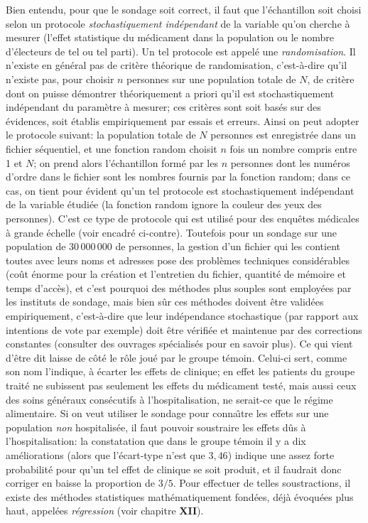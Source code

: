 Bien entendu, pour que le sondage soit correct, il faut que
l'\'echantillon soit choisi selon un protocole {\it stochastiquement 
ind\'ependant} de la variable qu'on cherche \`a mesurer (l'effet 
statistique du m\'edicament dans la population ou le nombre
d'\'electeurs de tel ou tel parti). Un tel protocole est appel\'e une {\it 
randomisation}. 
\medskip 
Il n'existe en g\'en\'eral pas de crit\`ere th\'eorique de randomisation, 
c'est-\`a-dire qu'il n'existe pas, pour choisir $n$ personnes sur une 
population totale de $N$, de crit\`ere dont on puisse d\'emontrer 
th\'eoriquement a priori qu'il est stochastiquement ind\'ependant du 
param\`etre \`a mesurer; ces crit\`eres sont soit bas\'es sur des 
{\og \'evidences\fg}, soit \'etablis empiriquement par essais et erreurs. 
Ainsi on peut adopter le protocole suivant: la population totale de $N$ 
personnes est enregistr\'ee dans un fichier s\'equentiel, et une fonction 
random choisit $n$ fois un nombre compris entre 1 et $N$; on prend alors 
l'\'echantillon form\'e par les $n$ personnes dont les num\'eros d'ordre 
dans le fichier sont les nombres fournis par la fonction random; dans ce 
cas, on tient pour {\og \'evident\fg} qu'un tel protocole est stochastiquement 
ind\'ependant de la variable \'etudi\'ee (la fonction random {\og ignore\fg}
la couleur des yeux des personnes). C'est ce type de protocole qui est 
utilis\'e pour des enqu\^etes m\'edicales \`a grande \'echelle (voir 
encadr\'e ci-contre). 
\medskip 
Toutefois pour un sondage sur une population de 
$30\, 000\, 000$ de personnes, la gestion d'un fichier qui les contient 
toutes avec leurs noms et adresses pose des probl\`emes techniques 
consid\'erables (co\^ut \'enorme pour la cr\'eation et l'entretien du 
fichier, quantit\'e de m\'emoire et temps d'acc\`es), et c'est pourquoi
des m\'ethodes plus souples sont employ\'ees par les instituts de 
sondage, mais bien s\^ur ces m\'ethodes doivent \^etre valid\'ees 
empiriquement, c'est-\`a-dire que leur ind\'ependance stochastique
(par rapport aux intentions de vote par exemple) doit \^etre v\'erifi\'ee 
et maintenue par des corrections constantes (consulter des ouvrages 
sp\'ecialis\'es pour en savoir plus). 
\medskip
Ce qui vient d'\^etre dit laisse de c\^ot\'e le r\^ole jou\'e par le groupe 
t\'emoin. Celui-ci sert, comme son nom l'indique, \`a \'ecarter les
effets de clinique; en effet les patients du groupe trait\'e ne subissent
pas seulement les effets du m\'edicament test\'e, mais aussi ceux des 
soins g\'en\'eraux cons\'ecutifs \`a l'hospitalisation, ne serait-ce que
le r\'egime alimentaire. Si on veut utiliser le sondage pour conna{\^\i}tre 
les effets sur une population {\it non} hospitalis\'ee, il faut pouvoir 
soustraire les effets d\^us \`a l'hospitalisation: la constatation que
dans le groupe t\'emoin il y a dix am\'eliorations (alors que 
l'\'ecart-type n'est que $3,46$) indique une assez forte probabilit\'e 
pour qu'un tel effet de clinique se soit produit, et il faudrait donc 
corriger en baisse la proportion de $3/5$. Pour effectuer de telles 
soustractions, il existe des m\'ethodes statistiques 
math\'ematiquement fond\'ees, d\'ej\`a \'evoqu\'ees plus haut, 
appel\'ees {\it r\'egression} (voir chapitre {\bf XII}). 
 

